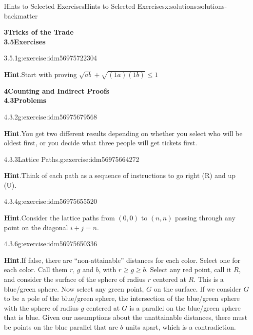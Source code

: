 \documentclass[twoside,10pt,]{book}
\newcommand{\blocktitlefont}{\relax}
\numberwithin{equation}{section}
\begin{document}
\begin{solutions-chapter}{Hints  to Selected Exercises}{}{Hints  to Selected Exercises}{}{}{x:solutions:solutions-backmatter}
\par\medskip
\noindent\textbf{\Large{}3\space\textperiodcentered\space{}Tricks of the Trade\\
3.5\space\textperiodcentered\space{}Exercises}
\begin{divisionsolution}{3.5.1}{}{g:exercise:idm56975722304}%
\par\smallskip%
\noindent\textbf{\blocktitlefont Hint}.\hypertarget{g:hint:idm56975720560-back}{}\quad{}Start with proving  \(\sqrt{a b}+ \sqrt{(1a)(1b)} \leq 1\)%
\end{divisionsolution}%
\par\medskip
\noindent\textbf{\Large{}4\space\textperiodcentered\space{}Counting and Indirect Proofs\\
4.3\space\textperiodcentered\space{}Problems}
\begin{divisionsolution}{4.3.2}{}{g:exercise:idm56975679568}%
\par\smallskip%
\noindent\textbf{\blocktitlefont Hint}.\hypertarget{g:hint:idm56975665504-back}{}\quad{}You get two different results depending on whether you select who will be oldest first, or you decide what three people will get tickets first.%
\end{divisionsolution}%
\begin{divisionsolution}{4.3.3}{Lattice Paths.}{g:exercise:idm56975664272}%
\par\smallskip%
\noindent\textbf{\blocktitlefont Hint}.\hypertarget{g:hint:idm56975659008-back}{}\quad{}Think of each path as a sequence of instructions to go right (R) and up (U).%
\end{divisionsolution}%
\begin{divisionsolution}{4.3.4}{}{g:exercise:idm56975655520}%
\par\smallskip%
\noindent\textbf{\blocktitlefont Hint}.\hypertarget{g:hint:idm56975653792-back}{}\quad{}Consider the lattice paths from \((0,0)\) to \((n,n)\) passing through any point on the diagonal \(i + j = n\).%
\end{divisionsolution}%
\begin{divisionsolution}{4.3.6}{}{g:exercise:idm56975650336}%
\par\smallskip%
\noindent\textbf{\blocktitlefont Hint}.\hypertarget{g:hint:idm56975648928-back}{}\quad{}If false, there are ``non-attainable'' distances for each color. Select one for each color.  Call them \(r\), \(g\) and \(b\), with  \(r \geq g \geq b\).  Select any red point, call it \(R\), and consider the surface of the sphere of radius \(r\) centered at \(R\).   This is a blue\slash{}green sphere.   Now select any green point, \(G\) on the surface. If we consider \(G\) to be a pole of the blue\slash{}green sphere, the intersection of the blue\slash{}green sphere with the sphere of radius \(g\)  centered at \(G\) is a parallel on the blue\slash{}green sphere that is blue.  Given our assumptions about the unattainable distances, there must be points on the blue parallel that are \(b\) units apart, which is a contradiction.%

\end{divisionsolution}
\end{solutions-chapter}
\end{document}
